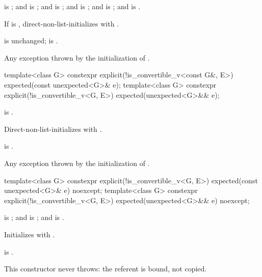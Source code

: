 \begin{itemdescr}
\pnum
\constraints
{} is ; and  is ; and  is ; and  is ; and  is ; and  is .

\pnum
\effects
If  is , direct-non-list-initializes  with .

\pnum
\ensures
{} is unchanged;  is .

\pnum
\throws
Any exception thrown by the initialization of .
\end{itemdescr}

%
\begin{itemdecl}
template<class G>
constexpr explicit(!is_convertible_v<const G&, E>) expected(const unexpected<G>& e);
template<class G>
constexpr explicit(!is_convertible_v<G, E>) expected(unexpected<G>&& e);
\end{itemdecl}

\begin{itemdescr}
\pnum
\constraints
{} is .

\pnum
\effects
Direct-non-list-initializes  with .

\pnum
\ensures
{} is .

\pnum
\throws
Any exception thrown by the initialization of .
\end{itemdescr}

%
\begin{itemdecl}
template<class G>
constexpr explicit(!is_convertible_v<G, E>) expected(const unexpected<G>& e) noexcept;
template<class G>
constexpr explicit(!is_convertible_v<G, E>) expected(unexpected<G>&& e) noexcept;
\end{itemdecl}

\begin{itemdescr}
\pnum
\constraints
{} is ; and  is ; and  is .

\pnum
\effects
Initializes  with .

\pnum
\ensures
{} is .

\pnum
\remarks
This constructor never throws: the referent is bound, not copied.
\end{itemdescr}

